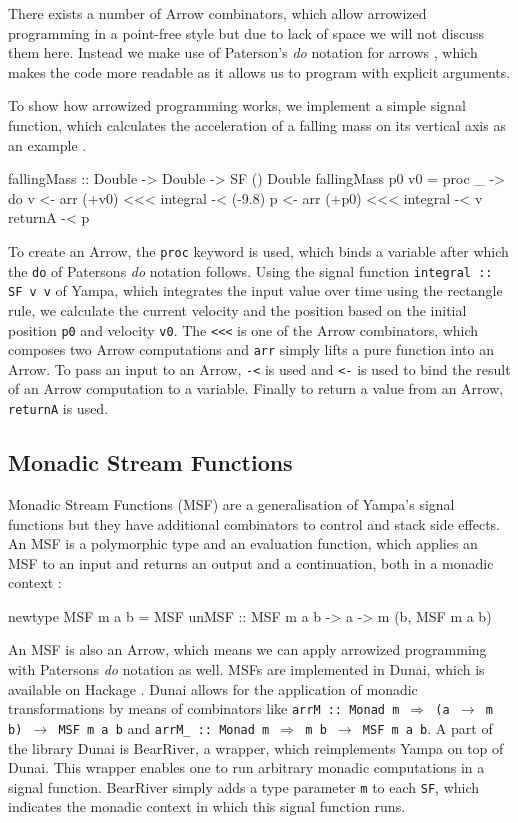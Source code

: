 There exists a number of Arrow combinators, which allow arrowized programming in a point-free style but due to lack of space we will not discuss them here. Instead we make use of Paterson's \textit{do} notation for arrows \cite{paterson_new_2001}, which makes the code more readable as it allows us to program with explicit arguments.

To show how arrowized programming works, we implement a simple signal function, which calculates the acceleration of a falling mass on its vertical axis as an example \cite{perez_testing_2017}.

\begin{HaskellCode}
fallingMass :: Double -> Double -> SF () Double
fallingMass p0 v0 = proc _ -> do
  v <- arr (+v0) <<< integral -< (-9.8)
  p <- arr (+p0) <<< integral -< v
  returnA -< p
\end{HaskellCode}

To create an Arrow, the \texttt{proc} keyword is used, which binds a variable after which the \texttt{do} of Patersons \textit{do} notation \cite{paterson_new_2001} follows. Using the signal function \texttt{integral :: SF v v} of Yampa, which integrates the input value over time using the rectangle rule, we calculate the current velocity and the position based on the initial position \texttt{p0} and velocity \texttt{v0}. The \texttt{<<<} is one of the Arrow combinators, which composes two Arrow computations and \texttt{arr} simply lifts a pure function into an Arrow. To pass an input to an Arrow, \texttt{-<} is used and \texttt{<-} is used to bind the result of an Arrow computation to a variable. Finally to return a value from an Arrow, \texttt{returnA} is used.

\subsection{Monadic Stream Functions}
\label{sec:back_msf}
Monadic Stream Functions (MSF) are a generalisation of Yampa's signal functions but they have additional combinators to control and stack side effects. An MSF is a polymorphic type and an evaluation function, which applies an MSF to an input and returns an output and a continuation, both in a monadic context \cite{perez_extensible_2017,perez_functional_2016}:
\begin{HaskellCode}
newtype MSF m a b = MSF {unMSF :: MSF m a b -> a -> m (b, MSF m a b)}
\end{HaskellCode}

An MSF is also an Arrow, which means we can apply arrowized programming with Patersons \textit{do} notation as well. MSFs are implemented in Dunai, which is available on Hackage \cite{dunai_library}. Dunai allows for the application of monadic transformations by means of combinators like \texttt{arrM :: Monad m $\Rightarrow$ (a $\rightarrow$ m b) $\rightarrow$ MSF m a b} and \texttt{arrM\_ :: Monad m $\Rightarrow$ m b $\rightarrow$ MSF m a b}. A part of the library Dunai is BearRiver, a wrapper, which reimplements Yampa on top of Dunai. This wrapper enables one to run arbitrary monadic computations in a signal function. BearRiver simply adds a type parameter \texttt{m} to each \texttt{SF}, which indicates the monadic context in which this signal function runs.

